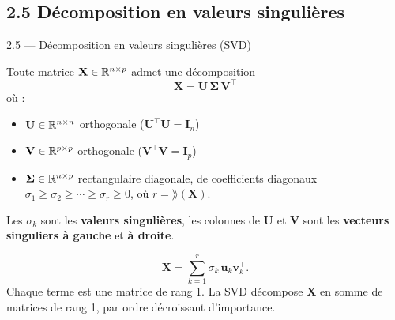 \subsection{2.5 Décomposition en valeurs singulières}
\begin{frame}{2.5 — Décomposition en valeurs singulières (SVD)}
\begin{theorem}[SVD]
Toute matrice $\mathbf{X} \in \mathbb{R}^{n \times p}$ admet une décomposition
\[
\boxed{\;\mathbf{X} = \mathbf{U}\, \mathbf{\Sigma}\, \mathbf{V}^\top\;}
\]
où :
\begin{itemize}
  \item $\mathbf{U} \in \mathbb{R}^{n \times n}$ orthogonale ($\mathbf{U}^\top \mathbf{U} = \mathbf{I}_n$)
  \item $\mathbf{V} \in \mathbb{R}^{p \times p}$ orthogonale ($\mathbf{V}^\top \mathbf{V} = \mathbf{I}_p$)
  \item $\mathbf{\Sigma} \in \mathbb{R}^{n \times p}$ rectangulaire diagonale, de coefficients
        diagonaux $\sigma_1 \geq \sigma_2 \geq \cdots \geq \sigma_r \geq 0$,
        où $r = \rang(\mathbf{X})$.
\end{itemize}
Les $\sigma_k$ sont les \textbf{valeurs singulières}, les colonnes de
$\mathbf{U}$ et $\mathbf{V}$ sont les \textbf{vecteurs singuliers à gauche} et
\textbf{à droite}.
\end{theorem}

\begin{prop}
\[
\mathbf{X} = \sum_{k=1}^r \sigma_k\, \mathbf{u}_k \mathbf{v}_k^\top.
\]
Chaque terme est une matrice de rang 1. La SVD décompose $\mathbf{X}$ en
\alert{somme} de matrices de rang 1, par ordre décroissant d'importance.
\end{prop}
\end{frame}

